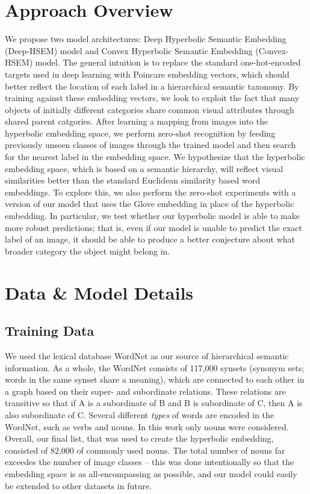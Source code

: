 \documentclass[12pt]{report}
\begin{document}
\section{Approach Overview}
We propose two model architectures: Deep Hyperbolic Semantic Embedding (Deep-HSEM) model and Convex Hyperbolic Semantic Embedding (Convex-HSEM) model. The general intuition is to replace the standard one-hot-encoded targets used in deep learning with Poincare embedding vectors, which should better reflect the location of each label in a hierarchical semantic taxonomy. By training against these embedding vectors, we look to exploit the fact that many objects of initially different categories share common visual attributes through shared parent catgories. After learning a mapping from images into the hyperbolic embedding space, we perform zero-shot recognition by feeding previously unseen classes of images through the trained model and then search for the nearest label in the embedding space. We hypothesize that the hyperbolic embedding space, which is based on a semantic hierarchy, will reflect visual similarities better than the standard Euclidean similarity based word embeddings. To explore this, we also perform the zero-shot experiments with a version of our model that uses the Glove embedding \cite{Pennington2014} in place of the hyperbolic embedding. In particular, we test whether our hyperbolic model is able to make more robust predictions; that is, even if our model is unable to predict the exact label of an image, it should be able to produce a better conjecture about what broader category the object might belong in.

\section{Data \& Model Details}
\subsection{Training Data}
We used the lexical database WordNet \cite{Miller1995} as our source of hierarchical semantic information. As a whole, the WordNet consists of 117,000 synsets (synonym sets; words in the same synset share a meaning), which are connected to each other in a graph based on their super- and subordinate relations. These relations are transitive so that if A is a subordinate of B and B is subordinate of C, then A is also subordinate of C. Several different \textit{types} of words are encoded in the WordNet, such as verbs and nouns. In this work only nouns were considered. Overall, our final list, that was used to create the hyperbolic embedding, consisted of 82,000 of commonly used nouns. The total number of nouns far exceedes the number of image classes -- this was done intentionally so that the embedding space is as all-encompassing as possible, and our model could easily be extended to other datasets in future.
\end{document}
